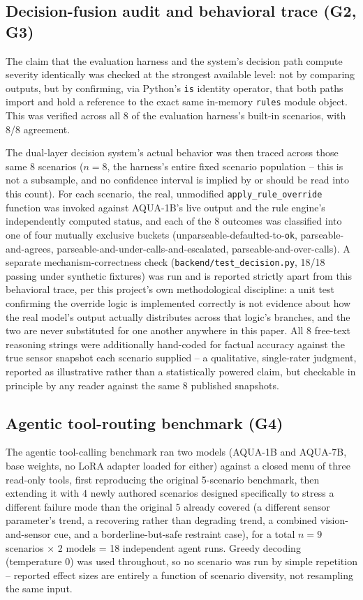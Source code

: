 \subsection{Decision-fusion audit and behavioral trace (G2, G3)}

The claim that the evaluation harness and the system's decision path compute severity
identically was checked at the strongest available level: not by comparing outputs, but by
confirming, via Python's \texttt{is} identity operator, that both paths import and hold a reference
to the exact same in-memory \texttt{rules} module object. This was verified across all 8 of the
evaluation harness's built-in scenarios, with 8/8 agreement.

The dual-layer decision system's actual behavior was then traced across those same 8 scenarios
($n=8$, the harness's entire fixed scenario population -- this is not a subsample, and no
confidence interval is implied by or should be read into this count). For each scenario, the real,
unmodified \texttt{apply\_rule\_override} function was invoked against AQUA-1B's live output and
the rule engine's independently computed status, and each of the 8 outcomes was classified into one
of four mutually exclusive buckets (unparseable-defaulted-to-\texttt{ok}, parseable-and-agrees,
parseable-and-under-calls-and-escalated, parseable-and-over-calls). A separate mechanism-correctness
check (\texttt{backend/test\_decision.py}, 18/18 passing under synthetic fixtures) was run and is
reported strictly apart from this behavioral trace, per this project's own methodological
discipline: a unit test confirming the override logic is implemented correctly is not evidence
about how the real model's output actually distributes across that logic's branches, and the two
are never substituted for one another anywhere in this paper. All 8 free-text reasoning strings
were additionally hand-coded for factual accuracy against the true sensor snapshot each scenario
supplied -- a qualitative, single-rater judgment, reported as illustrative rather than a
statistically powered claim, but checkable in principle by any reader against the same 8 published
snapshots.

\subsection{Agentic tool-routing benchmark (G4)}

The agentic tool-calling benchmark ran two models (AQUA-1B and AQUA-7B, base weights, no LoRA
adapter loaded for either) against a closed menu of three read-only tools, first reproducing the
original 5-scenario benchmark, then extending it with 4 newly authored scenarios designed
specifically to stress a different failure mode than the original 5 already covered (a different
sensor parameter's trend, a recovering rather than degrading trend, a combined vision-and-sensor
cue, and a borderline-but-safe restraint case), for a total $n=9$ scenarios $\times$ 2 models = 18
independent agent runs. Greedy decoding (temperature 0) was used throughout, so no scenario was run
by simple repetition -- reported effect sizes are entirely a function of scenario diversity, not
resampling the same input.

